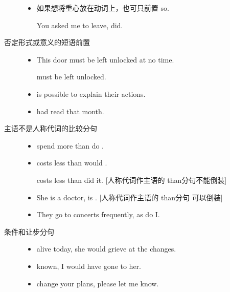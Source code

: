 \begin{description}
\begin{description}
\begin{itemize}
    \item 如果想将重心放在动词上，也可只前置 so.

      You asked me to leave,   did.
    \end{itemize}

  \item[否定形式或意义的短语前置]
    \begin{itemize}
    \item This door must be left unlocked at no time.

       must  be left unlocked.

    \item {} is  possible to explain their actions.

    \item {} had  read that month.
    \end{itemize}

  \item[主语不是人称代词的比较分句]
    \begin{itemize}

    \item {} spend more than do .

    \item {} costs less than would .

       costs less than did \sout{it}. [人称代词作主语的 than分句不能倒装]

    \item She is a doctor,  is . [人称代词作主语的 than分句
      可以倒装]

    \item They go to concerts frequently, as do I.

    \end{itemize}

  \item[条件和让步分句]
    \begin{itemize}
    \item {}  alive today, she would grieve at the changes.
    \item {}  known, I would have gone to her.
    \item {}  change your plans, please let me know.
    \end{itemize}
  \end{description}
\end{description}

